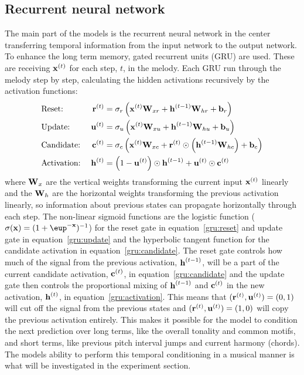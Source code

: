 \subsection{Recurrent neural network} %
\label{sub:recurrent_neural_network}
	The main part of the models is the recurrent neural network in the center transferring temporal information from the input network to the output network.
	To enhance the long term memory, gated recurrent units (GRU) are used. These are receiving $\bm{\mathrm{x}}^{(t)}$ for each step, $t$, in the melody. Each GRU run through the melody step by step, calculating the hidden activations recursively by the activation functions:
	\begin{alignat}{2}
	 	& \text{Reset:} \; & \bm{\mathrm{r}}^{(t)} &= \sigma_r\left(\bm{\mathrm{x}}^{(t)} \bm{\mathrm{W}}_{xr} + \bm{\mathrm{h}}^{(t-1)} \bm{\mathrm{W}}_{hr} + \bm{\mathrm{b}}_r\right) \label{gru:reset} \\
        & \text{Update:} \; & \bm{\mathrm{u}}^{(t)} &= \sigma_u\left(\bm{\mathrm{x}}^{(t)} \bm{\mathrm{W}}_{xu} + \bm{\mathrm{h}}^{(t-1)} \bm{\mathrm{W}}_{hu} + \bm{\mathrm{b}}_u\right) \label{gru:update} \\
        & \text{Candidate:} \; & \bm{\mathrm{c}}^{(t)} &= \sigma_c\left(\bm{\mathrm{x}}^{(t)} \bm{\mathrm{W}}_{xc} + \bm{\mathrm{r}}^{(t)} \odot \left(\bm{\mathrm{h}}^{(t-1)} \bm{\mathrm{W}}_{hc}\right) + \bm{\mathrm{b}}_c\right) \label{gru:candidate} \\
        & \text{Activation:} \; & \bm{\mathrm{h}}^{(t)} &= \left(1 - \bm{\mathrm{u}}^{(t)}\right) \odot \bm{\mathrm{h}}^{(t-1)} + \bm{\mathrm{u}}^{(t)} \odot \bm{\mathrm{c}}^{(t)} \label{gru:activation}
	\end{alignat}
	where $\bm{\mathrm{W}}_x$ are the vertical weights transforming the current input $\bm{\mathrm{x}}^{(t)}$ linearly and the $\bm{\mathrm{W}}_h$ are the horizontal weights transforming the previous activation linearly, so information about previous states can propagate horizontally through each step. The non-linear sigmoid functions are the logistic function ($\sigma(\vec{x})=(1+\eup^{-\vec{x}})^{-1}$) for the reset gate in equation~\eqref{gru:reset} and update gate in equation~\eqref{gru:update} and the hyperbolic tangent function for the candidate activation in equation~\eqref{gru:candidate}. The reset gate controls how much of the signal from the previous activation, $\bm{\mathrm{h}}^{(t-1)}$, will be a part of the current candidate activation, $\bm{\mathrm{c}}^{(t)}$, in equation~\eqref{gru:candidate} and the update gate then controls the proportional mixing of $\bm{\mathrm{h}}^{(t-1)}$ and $\bm{\mathrm{c}}^{(t)}$ in the new activation, $\bm{\mathrm{h}}^{(t)}$, in equation~\eqref{gru:activation}. This means that $(\bm{\mathrm{r}}^{(t)}, \bm{\mathrm{u}}^{(t)}) = (0,1)$ will cut off the signal from the previous states and $(\bm{\mathrm{r}}^{(t)}, \bm{\mathrm{u}}^{(t)}) = (1,0)$ will copy the previous activation entirely. This makes it possible for the model to condition the next prediction over long terms, like the overall tonality and common motifs, and short terms, like previous pitch interval jumps and current harmony (chords). The models ability to perform this temporal conditioning in a musical manner is what will be investigated in the experiment section. 

